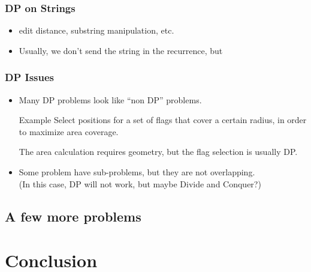 \documentclass{beamer}
\begin{document}


\begin{frame}
  \frametitle{DP on Strings}
  \begin{itemize}
  \item edit distance, substring manipulation, etc.
  \item Usually, we don't send the string in the recurrence, but
    \\
  \end{itemize}
\end{frame}

\begin{frame}
  \frametitle{DP Issues}
  
  {\small
  \begin{itemize}
  \item Many DP problems look like ``non DP'' problems. 

    \begin{block}{Example}
      Select positions for a set of flags that cover a certain
      radius, in order to maximize area coverage. 

      \medskip
      
      The area calculation requires geometry, but the flag selection is 
      usually DP.
    \end{block}
    
    \medskip
    
  \item Some problem have sub-problems, but they are not overlapping.\\
    (In this case, DP will not work, but maybe Divide and Conquer?)
  \end{itemize}}
\end{frame}

\subsection{A few more problems}


\section{Conclusion}
\end{document}
